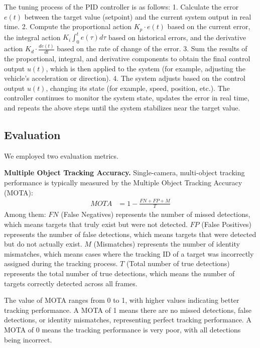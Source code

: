\documentclass[lettersize,journal]{IEEEtran}
\begin{document}
The tuning process of the PID controller is as follows:  
1. Calculate the error $e(t)$ between the target value (setpoint) and the current system output in real time.  
2. Compute the proportional action $K_{p} \cdot e(t)$ based on the current error, the integral action $K_{i} \int_{0}^{t} e(\tau) d \tau$ based on historical errors, and the derivative action $K_{d} \cdot \frac{d e(t)}{d t}$ based on the rate of change of the error.  
3. Sum the results of the proportional, integral, and derivative components to obtain the final control output $u(t)$, which is then applied to the system (for example, adjusting the vehicle's acceleration or direction). 
4. The system adjusts based on the control output $u(t)$, changing its state (for example, speed, position, etc.). 
The controller continues to monitor the system state, updates the error in real time, and repeats the above steps until the system stabilizes near the target value.


\subsection{Evaluation}

We employed two evaluation metrics.

\textbf{Multiple Object Tracking Accuracy.}
Single-camera, multi-object tracking performance is typically measured by the Multiple Object Tracking Accuracy (MOTA):
\begin{align}
	\mathit{MOTA} & = 1-\frac{F N+F P+M}{T}
\end{align}
Among them:
$FN$ (False Negatives) represents the number of missed detections, which means targets that truly exist but were not detected.
$FP$ (False Positives) represents the number of false detections, which means targets that were detected but do not actually exist.
$M$ (Mismatches) represents the number of identity mismatches, which means cases where the tracking ID of a target was incorrectly assigned during the tracking process.
$T$ (Total number of true detections) represents the total number of true detections, which means the number of targets correctly detected across all frames.

The value of MOTA ranges from 0 to 1, with higher values indicating better tracking performance. 
A MOTA of 1 means there are no missed detections, false detections, or identity mismatches, representing perfect tracking performance. 
A MOTA of 0 means the tracking performance is very poor, with all detections being incorrect.
\end{document}
